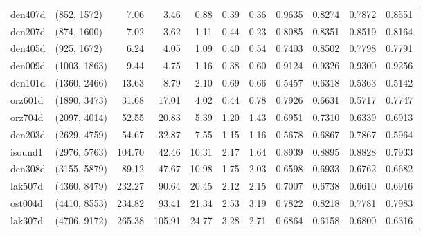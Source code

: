 \begin{tabular}{llrrrrrrrrr}
 den407d &  (852, 1572) &   7.06 &   3.46 &  0.88 &  0.39 &   0.36 &   0.9635 &   0.8274 &     0.7872 &      0.8551 \\
 den207d &  (874, 1600) &   7.02 &   3.62 &  1.11 &  0.44 &   0.23 &   0.8085 &   0.8351 &     0.8519 &      0.8164 \\
 den405d &  (925, 1672) &   6.24 &   4.05 &  1.09 &  0.40 &   0.54 &   0.7403 &   0.8502 &     0.7798 &      0.7791 \\
 den009d & (1003, 1863) &   9.44 &   4.75 &  1.16 &  0.38 &   0.60 &   0.9124 &   0.9326 &     0.9300 &      0.9256 \\
 den101d & (1360, 2466) &  13.63 &   8.79 &  2.10 &  0.69 &   0.66 &   0.5457 &   0.6318 &     0.5363 &      0.5142 \\
 orz601d & (1890, 3473) &  31.68 &  17.01 &  4.02 &  0.44 &   0.78 &   0.7926 &   0.6631 &     0.5717 &      0.7747 \\
 orz704d & (2097, 4014) &  52.55 &  20.83 &  5.39 &  1.20 &   1.43 &   0.6951 &   0.7310 &     0.6339 &      0.6913 \\
 den203d & (2629, 4759) &  54.67 &  32.87 &  7.55 &  1.15 &   1.16 &   0.5678 &   0.6867 &     0.7867 &      0.5964 \\
 isound1 & (2976, 5763) & 104.70 &  42.46 & 10.31 &  2.17 &   1.64 &   0.8939 &   0.8895 &     0.8828 &      0.7933 \\
 den308d & (3155, 5879) &  89.12 &  47.67 & 10.98 &  1.75 &   2.03 &   0.6598 &   0.6933 &     0.6762 &      0.6682 \\
 lak507d & (4360, 8479) & 232.27 &  90.64 & 20.45 &  2.12 &   2.15 &   0.7007 &   0.6738 &     0.6610 &      0.6916 \\
 ost004d & (4410, 8553) & 234.82 &  93.41 & 21.34 &  2.53 &   3.19 &   0.7822 &   0.8218 &     0.7781 &      0.7983 \\
 lak307d & (4706, 9172) & 265.38 & 105.91 & 24.77 &  3.28 &   2.71 &   0.6864 &   0.6158 &     0.6800 &      0.6316 \\
\bottomrule
\end{tabular}

